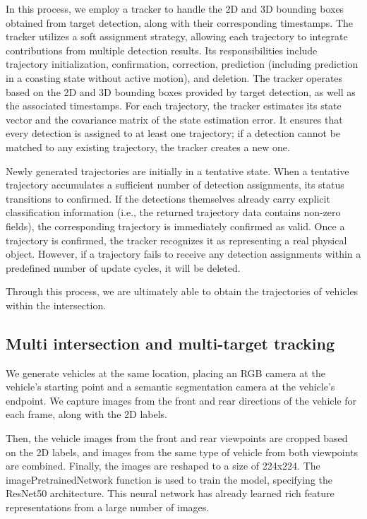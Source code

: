 In this process, we employ a tracker to handle the 2D and 3D bounding boxes obtained from target detection, along with their corresponding timestamps. 
The tracker utilizes a soft assignment strategy, allowing each trajectory to integrate contributions from multiple detection results. 
Its responsibilities include trajectory initialization, confirmation, correction, prediction (including prediction in a coasting state without active motion), and deletion. 
The tracker operates based on the 2D and 3D bounding boxes provided by target detection, as well as the associated timestamps. 
For each trajectory, the tracker estimates its state vector and the covariance matrix of the state estimation error. 
It ensures that every detection is assigned to at least one trajectory; if a detection cannot be matched to any existing trajectory, the tracker creates a new one.

Newly generated trajectories are initially in a tentative state. 
When a tentative trajectory accumulates a sufficient number of detection assignments, its status transitions to confirmed. 
If the detections themselves already carry explicit classification information (i.e., the returned trajectory data contains non-zero fields), the corresponding trajectory is immediately confirmed as valid. 
Once a trajectory is confirmed, the tracker recognizes it as representing a real physical object. 
However, if a trajectory fails to receive any detection assignments within a predefined number of update cycles, it will be deleted.

Through this process, we are ultimately able to obtain the trajectories of vehicles within the intersection.


\subsection{Multi intersection and multi-target tracking}

We generate vehicles at the same location, placing an RGB camera at the vehicle's starting point and a semantic segmentation camera at the vehicle's endpoint.
We capture images from the front and rear directions of the vehicle for each frame, along with the 2D labels.
 
Then, the vehicle images from the front and rear viewpoints are cropped based on the 2D labels, and images from the same type of vehicle from both viewpoints are combined. Finally, the images are reshaped to a size of 224x224.
The imagePretrainedNetwork function is used to train the model, specifying the ResNet50 architecture. 
This neural network has already learned rich feature representations from a large number of images.

